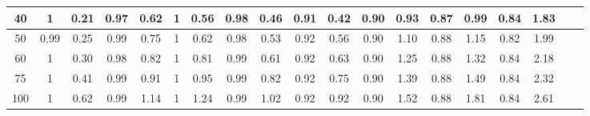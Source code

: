\documentclass[preprint,12pt]{elsarticle}
\begin{document}
\begin{landscape}
\begin{table}[b]
\begin{tabular}{c c c c c c c c c c c c c c c c c c c}
40	  &		1    & 	0.21		& 		0.97 & 	0.62  &		1    & 0.56	&		0.98 & 	0.46		&	 0.91 &	0.42  & 0.90 &  0.93 &	0.87 &	0.99  &	0.84 & 	1.83 \\\hline
50		&		0.99 & 	0.25	  & 		0.99 & 	0.75	&		1    & 0.62	& 	0.98 & 	0.53		&	 0.92 &	0.56  & 0.90 &  1.10 &	0.88 &	1.15  &	0.82 & 	1.99 \\\hline
60		&		1    & 	0.30		& 		0.98 & 	0.82  &		1    & 0.81	&		0.99 & 	0.61		&	 0.92 &	0.63  & 0.90 &  1.25 &	0.88 &	1.32  &	0.84 & 	2.18 \\\hline
75		&		1    & 	0.41		& 		0.99 & 	0.91	&		1    & 0.95	&		0.99 & 	0.82		&	 0.92 &	0.75  & 0.90 &  1.39 &	0.88 &	1.49 &	0.84 & 	2.32 \\\hline
100		&		1    &  0.62		& 	  0.99 & 	1.14  &		1    & 1.24	&		0.99 & 	1.02		&	 0.92&	0.92  & 0.90 &  1.52 &  0.88 &	1.81 &	0.84 & 	2.61 \\\hline
\bottomrule
\end{tabular}
\end{table}

\end{landscape}
\end{document}
